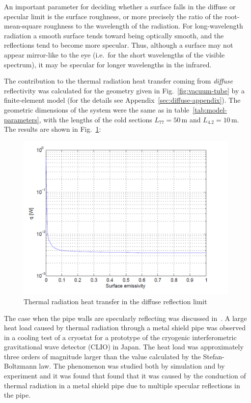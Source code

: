 An important parameter for deciding whether a surface falls in the diffuse or specular limit is the surface roughness, or more precisely the ratio of the root-mean-square roughness to the wavelength of the radiation. For long-wavelength radiation a smooth surface tends toward being optically smooth, and the reflections tend to become more specular. Thus, although a surface may not appear mirror-like to the eye (i.e.\ for the short wavelengths of the visible spectrum), it may be specular for longer wavelengths in the infrared.

The contribution to the thermal radiation heat transfer coming from \emph{diffuse} reflectivity was calculated for the geometry given in Fig.~\ref{fig:vacuum-tube} by a finite-element model (for the details see Appendix~\ref{sec:diffuse-appendix}). The geometric dimensions of the system were the same as in table~\ref{tab:model-parameters}, with the lengths of the cold sections $L_{77}= 50$\,m and  $L_{4.2}= 10$\,m. The results are shown in Fig.~\ref{fig:q_eps_diffuse}:
\begin{figure}[htbp]
\begin{center}
 \includegraphics[width=11cm]{Sec_SiteInfra/Cryotraps/q_eps_diffuse.pdf}
			\caption{Thermal radiation heat transfer in the diffuse reflection limit}
\label{fig:q_eps_diffuse}
\end{center}
\end{figure}

The case when the pipe walls are specularly reflecting was discussed in~\cite{tomaru_2007, tomaru_2008}. A large heat load caused by thermal radiation through a metal shield pipe was observed in a cooling test of a cryostat for a prototype of the cryogenic
interferometric gravitational wave detector (CLIO) in Japan. The heat load was approximately
three orders of magnitude larger than the value calculated by the Stefan-Boltzmann law. The phenomenon was studied both by simulation and by experiment and it was found that found that it was caused by the conduction of thermal radiation in a metal shield pipe due to multiple specular reflections in the pipe. 

